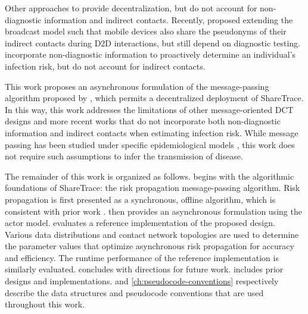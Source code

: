 Other approaches to  \citep{Cho2020, Reichert2020} provide decentralization, but do not account for non-diagnostic information and indirect contacts. Recently, \citet{Cherini2023} proposed extending the broadcast model such that mobile devices also share the pseudonyms of their indirect contacts during D2D interactions, but still depend on diagnostic testing. \citet{Gupta2023} incorporate non-diagnostic information to proactively determine an individual's infection risk, but do not account for indirect contacts.

This work proposes an asynchronous formulation of the message-passing algorithm proposed by \citet{Ayday2021}, which permits a decentralized deployment of ShareTrace. In this way, this work addresses the limitations of other message-oriented DCT designs \citep{Cho2020, Reichert2020} and more recent works \citep{Cherini2023, Gupta2023} that do not incorporate both non-diagnostic information and indirect contacts when estimating infection risk. While message passing has been studied under specific epidemiological models \citep{Karrer2010, Li2021}, this work does not require such assumptions to infer the transmission of disease.

The remainder of this work is organized as follows.  begins with the algorithmic foundations of ShareTrace: the risk propagation message-passing algorithm. Risk propagation is first presented as a synchronous, offline algorithm, which is consistent with prior work \citep{Ayday2021}.  then provides an asynchronous formulation using the actor model.  evaluates a reference implementation of the proposed design. Various data distributions and contact network topologies are used to determine the parameter values that optimize asynchronous risk propagation for accuracy and efficiency. The runtime performance of the reference implementation is similarly evaluated.  concludes with directions for future work.  includes prior designs and implementations.  and \cref{ch:pseudocode-conventions} respectively describe the data structures and pseudocode conventions that are used throughout this work.